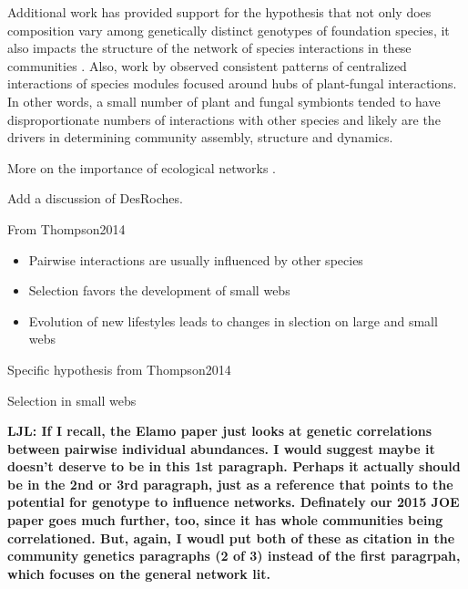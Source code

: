 \documentclass[11pt,twocolumn,twoside,lineno]{pnas-new}
\begin{document}
Additional work has provided support for the hypothesis that not only
does composition vary among genetically distinct genotypes of
foundation species, it also impacts the structure of the network of
species interactions in these communities \cite{Keith2017,
  Lau2015a}. Also, work by \citep{Toju2017, Toju2016, Toju2014a}
observed consistent patterns of centralized interactions of species
modules focused around hubs of plant-fungal interactions. In other
words, a small number of plant and fungal symbionts tended to have
disproportionate numbers of interactions with other species and likely
are the drivers in determining community assembly, structure and
dynamics.


More on the importance of ecological networks \cite{Guimaraes2011,
  Thompson2013a}.

Add a discussion of DesRoches.

From Thompson2014

\begin{itemize}
\item Pairwise interactions are usually influenced by other species
\item Selection favors the development of small webs
\item Evolution of new lifestyles leads to changes in slection on
  large and small webs
\end{itemize}

Specific hypothesis from Thompson2014

Selection in small webs



\textbf{LJL: If I recall, the Elamo paper just looks at genetic
  correlations between pairwise individual abundances. I would suggest
  maybe it doesn’t deserve to be in this 1st paragraph. Perhaps it
  actually should be in the 2nd or 3rd paragraph, just as a reference
  that points to the potential for genotype to influence
  networks. Definately our 2015 JOE paper goes much further, too,
  since it has whole communities being correlationed. But, again, I
  woudl put both of these as citation in the community genetics
  paragraphs (2 of 3) instead of the first paragrpah, which focuses on
  the general network lit.}
\end{document}
